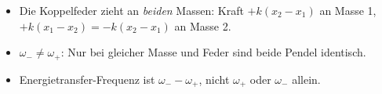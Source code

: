 \begin{achtung}
\begin{itemize}
  \item Die Koppelfeder zieht an \emph{beiden} Massen: Kraft $+k(x_2-x_1)$
       an Masse 1, $+k(x_1-x_2)=-k(x_2-x_1)$ an Masse 2.
  \item $\omega_-\neq\omega_+$: Nur bei gleicher Masse und Feder sind beide
       Pendel identisch.
  \item Energietransfer-Frequenz ist $\omega_--\omega_+$, nicht $\omega_+$
       oder $\omega_-$ allein.
\end{itemize}
\end{achtung}
